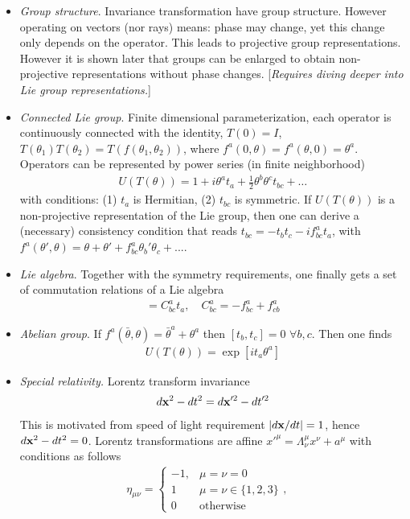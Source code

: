 \documentclass[12pt,a4paper]{article}
\begin{document}
\begin{itemize}
\item \textit{Group structure}. Invariance transformation have group structure. However operating on vectors (nor rays) means:  phase may change, yet this change only depends on the operator. This leads to projective group representations. However it is shown later that groups can be enlarged to obtain non-projective representations without phase changes. [\textit{Requires diving deeper into Lie group representations.}]
\item \textit{Connected Lie group}. Finite dimensional parameterization, each operator is continuously connected with the identity, $T(0) = I$, $T(\theta_1) T(\theta_2) = T(f(\theta_1,\theta_2))$, where $f^a(0,\theta) = f^a(\theta,0) = \theta^a$. Operators can be represented by power series (in finite neighborhood)
\begin{align}
U(T(\theta)) = 1 +  i \theta^a t_a + \frac 12 \theta^b \theta^c  t_{bc} + \dots
\end{align}
with conditions: (1) $t_a$ is Hermitian, (2) $t_{bc}$ is symmetric. If $U(T(\theta))$ is a non-projective representation of the Lie group, then one can derive a (necessary) consistency condition that reads $t_{bc} = - t_b t_c - i f^a_{bc} t_a$, with $f^a(\theta',\theta) = \theta+ \theta' + f^a_{bc} \theta_b' \theta_c+ ...$. 
\item \textit{Lie algebra}. Together with the symmetry requirements, one finally gets a set of commutation relations of a Lie algebra  
\begin{align}
[t_b, t_c]  = C^a_{bc} t_a, \quad C^a_{bc} = -f^a_{bc} + f^a_{cb} 
\end{align}
\item \textit{Abelian group}. If $f^a(\bar \theta,\theta) =\bar \theta^a + \theta^a$ then $[t_b, t_c] =0$ $\forall b,c$. Then one finds 
\begin{align}
U(T(\theta)) = \exp[i t_a \theta^a]
\end{align}
\item \textit{Special relativity.} Lorentz transform invariance
\begin{align}
d\mathbf x^2 - dt^2 = d \mathbf x'^2 - dt'^2
\end{align}
This is motivated from speed of light requirement $| d\mathbf x / dt |= 1$, hence $d \mathbf x^2 - dt^2= 0$. Lorentz transformations are affine $x'^\mu = \Lambda^\mu_\nu x^\nu + a^\mu$ with conditions as follows
\begin{align}
\eta_{\mu \nu} = \begin{cases} -1, & \mu=\nu=0 \\ 1 & \mu=\nu \in \{1,2,3\} \\ 0 & \text{otherwise} \end{cases}, \quad 

\end{align}
\end{itemize}
\end{document}
